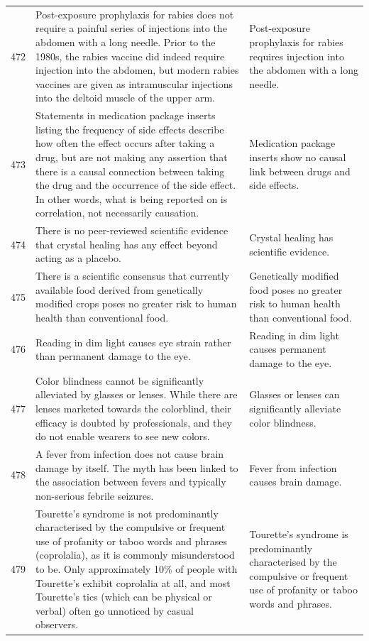 \begin{tabular}{c|p{}|p{}}
472 & Post-exposure prophylaxis for rabies does not require a painful series of injections into the abdomen with a long needle. Prior to the 1980s, the rabies vaccine did indeed require injection into the abdomen, but modern rabies vaccines are given as intramuscular injections into the deltoid muscle of the upper arm. & Post-exposure prophylaxis for rabies requires injection into the abdomen with a long needle. \\
473 & Statements in medication package inserts listing the frequency of side effects describe how often the effect occurs after taking a drug, but are not making any assertion that there is a causal connection between taking the drug and the occurrence of the side effect. In other words, what is being reported on is correlation, not necessarily causation. & Medication package inserts show no causal link between drugs and side effects. \\
474 & There is no peer-reviewed scientific evidence that crystal healing has any effect beyond acting as a placebo. & Crystal healing has scientific evidence. \\
475 & There is a scientific consensus that currently available food derived from genetically modified crops poses no greater risk to human health than conventional food. & Genetically modified food poses no greater risk to human health than conventional food. \\
476 & Reading in dim light causes eye strain rather than permanent damage to the eye. & Reading in dim light causes permanent damage to the eye. \\
477 & Color blindness cannot be significantly alleviated by glasses or lenses. While there are lenses marketed towards the colorblind, their efficacy is doubted by professionals, and they do not enable wearers to see new colors. & Glasses or lenses can significantly alleviate color blindness. \\
478 & A fever from infection does not cause brain damage by itself. The myth has been linked to the association between fevers and typically non-serious febrile seizures. & Fever from infection causes brain damage. \\
479 & Tourette's syndrome is not predominantly characterised by the compulsive or frequent use of profanity or taboo words and phrases (coprolalia), as it is commonly misunderstood to be. Only approximately 10\% of people with Tourette's exhibit coprolalia at all, and most Tourette's tics (which can be physical or verbal) often go unnoticed by casual observers. & Tourette's syndrome is predominantly characterised by the compulsive or frequent use of profanity or taboo words and phrases. \\

\end{tabular}
